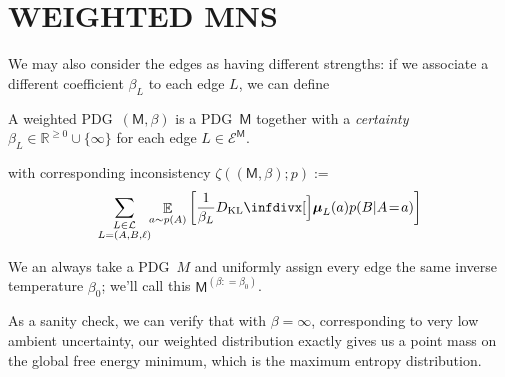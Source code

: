 \documentclass{article}
\def\sheq{\!=\!}
\newcommand{\bmu}{\boldsymbol{\mu}}
\newcommand{\Ed}{\mathcal E}
\newcommand{\sfM}{\mathsf M}
\newcommand{\MN}{PDG}
\newcommand{\MNs}{\MN s}
\numberwithin{equation}{section}
\begin{document}



	

		
	\section{WEIGHTED MNS}
	
	We may also consider the edges as having different strengths: if we associate a different coefficient $\beta_L$ to each edge $L$, we can define
	
	\begin{defn}
		A weighted \MN\ $(\sfM, \beta)$ is a \MN\ $\sfM$ together with a \emph{certainty} $\beta_L \in \mathbb R^{\geq 0} \cup \{\infty\}$ for each edge $L \in \Ed^\sfM$.
	\end{defn}
	
	with corresponding inconsistency $\zeta((\sfM, \beta) ; p) :=$
	\[
	\sum_{\substack{L \in \cal L\\L = (A,B, \ell)}}\!\! \mathop{\mathbb E}_{a \sim p(A)} \left[\frac{1}{\beta_L}\kldiv[\Big]{\bmu_{L}(a) }{ p(B | A \sheq a) } \right]
	\]
	
	We an always take a \MN\ $M$ and uniformly assign every edge the same inverse temperature $\beta_0$; we'll call this $\sfM^{(\beta\colon\!=\beta_0)}$.
	
	As a sanity check, we can verify that with $\beta = \infty$, corresponding to very low ambient uncertainty, our weighted distribution exactly gives us a point mass on the global free energy minimum, which is the maximum entropy distribution.
	
\end{document}
